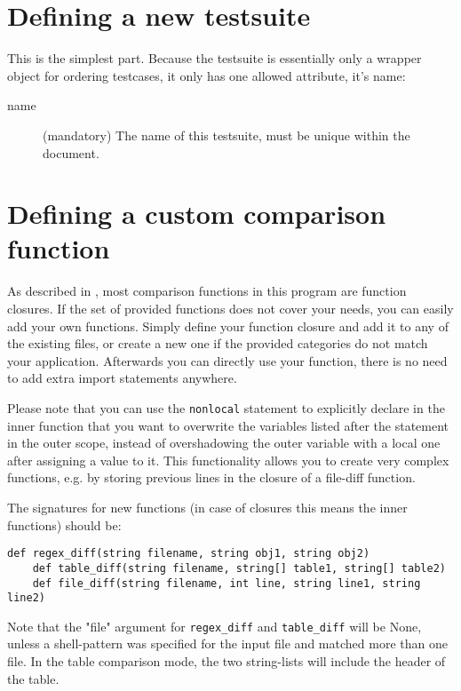 \documentclass[a4paper,12pt]{scrartcl}
\begin{document}
\section{Defining a new testsuite}
This is the simplest part. Because the testsuite is essentially only a wrapper object for ordering testcases, it only
has one allowed attribute, it's name:
\begin{description}
    \item[name] (mandatory) The name of this testsuite, must be unique within the document.
\end{description}

\section{Defining a custom comparison function}
As described in , most comparison functions in this program are function closures. If the set of
provided functions does not cover your needs, you can easily add your own functions. Simply define your function
closure and add it to any of the existing files, or create a new one if the provided categories do not match your
application. Afterwards you can directly use your function, there is no need to add extra import statements anywhere.

Please note that you can use the \texttt{nonlocal} statement to explicitly declare in the inner function that you
want to overwrite the variables listed after the statement in the outer scope, instead of overshadowing the outer
variable with a local one after assigning a value to it. This functionality allows you to create very complex
functions, e.g. by storing previous lines in the closure of a file-diff function.

The signatures for new functions (in case of closures this means the inner functions) should be:
\begin{Verbatim}[commandchars=~\{\},gobble=4, frame=single, framesep=2mm, label=required signatures for comparison
functions, labelposition=bottomline]
    def regex_diff(string filename, string obj1, string obj2)
    def table_diff(string filename, string[] table1, string[] table2)
    def file_diff(string filename, int line, string line1, string line2)
\end{Verbatim}
Note that the "file" argument for \texttt{regex\_diff} and \texttt{table\_diff} will be None, unless a shell-pattern
was specified for the input file and matched more than one file. In the table comparison mode, the two string-lists
will include the header of the table.
\end{document}
